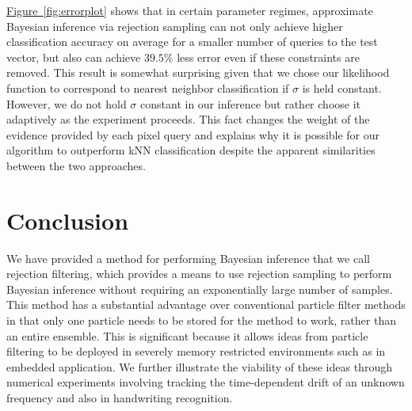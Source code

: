 \documentclass[twoside]{article}
\newcommand{\eq}[1]{\hyperref[eq:#1]{(\ref*{eq:#1})}}
\newcommand{\fig}[1]{\hyperref[fig:#1]{Figure~\ref*{fig:#1}}}
\newcommand{\alg}[1]{\hyperref[alg:#1]{Algorithm~\ref*{alg:#1}}}
\newcommand{\CRej}{\text{rejection filtering}}
\begin{document}
\fig{errorplot} shows that in certain parameter regimes, approximate Bayesian inference via rejection sampling can not only achieve higher classification accuracy on average for a smaller
number of queries to the test vector, but also can achieve $39.5\%$ less error even if these constraints are removed.  This result is somewhat surprising given that we chose our likelihood function to correspond to nearest neighbor classification if $\sigma$ is held constant.  However, we do not hold $\sigma$ constant in our inference but rather choose it adaptively as the experiment proceeds.  This fact changes the weight of the evidence provided by each pixel query and explains why it is possible for our algorithm to outperform kNN classification despite the apparent similarities between the two approaches.





%


\section{Conclusion}
We have provided a method for performing Bayesian inference that we call rejection filtering, which provides a means to use
rejection sampling to perform Bayesian inference without requiring an exponentially large number of samples.  This method has a substantial
advantage over conventional particle filter methods in that only one particle needs to be stored for the method to work, rather
than an entire ensemble.  This is significant because it allows ideas from particle filtering to be deployed in severely memory restricted
environments such as in embedded application.  We further illustrate the viability of these ideas through numerical experiments
involving tracking the time-dependent drift of an unknown frequency and also in handwriting recognition.
\end{document}
